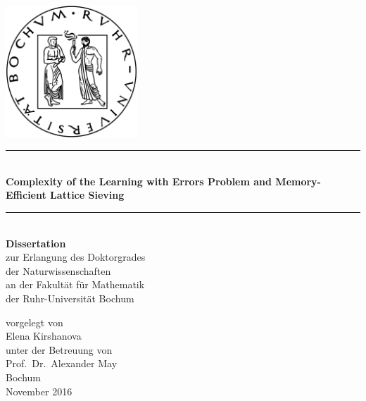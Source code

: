 \def\thesistitle{Complexity of the Learning with Errors Problem and Memory-Efficient Lattice Sieving}
\begin{titlepage}
	
	\centering
	\includegraphics[width=140pt]{Rublogo} \\[60pt]
	
		\rule[0pt]{\textwidth}{1pt}\\[7pt]
		{\LARGE \textbf{\thesistitle}}
		
		\rule[1pt]{\textwidth}{1pt}\\[70pt]
		
		{\Large \textbf{Dissertation}}\\ [20pt]
		{\Large zur Erlangung des Doktorgrades \\
		der Naturwissenschaften\\
		an der Fakult{\"a}t f{\"u}r Mathematik\\
		der Ruhr-Universit{\"a}t Bochum\\[35pt] }
		
		{\Large vorgelegt von\\[4pt]
			Elena Kirshanova}\\[20pt]
			
		{\Large unter der Betreuung von\\[4pt]
		Prof.\ Dr.\ Alexander May}\\[10pt]
	\vfill
	{Bochum \\ November 2016}
\end{titlepage}